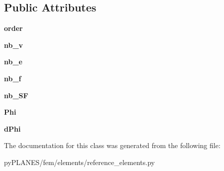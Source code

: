 \subsection*{Public Attributes}
\begin{DoxyCompactItemize}
\item 
\mbox{\label{classpy_p_l_a_n_e_s_1_1fem_1_1elements_1_1reference__elements_1_1_plot_kt_abc478f463a28762edb3e343e3fd0550d}} 
{\bfseries order}
\item 
\mbox{\label{classpy_p_l_a_n_e_s_1_1fem_1_1elements_1_1reference__elements_1_1_plot_kt_a360885cb9b9f72a6cd48cd97505694e8}} 
{\bfseries nb\+\_\+v}
\item 
\mbox{\label{classpy_p_l_a_n_e_s_1_1fem_1_1elements_1_1reference__elements_1_1_plot_kt_ad08640f7d41e5730576afde8b8f7cfdd}} 
{\bfseries nb\+\_\+e}
\item 
\mbox{\label{classpy_p_l_a_n_e_s_1_1fem_1_1elements_1_1reference__elements_1_1_plot_kt_a79eba5c966144c50e9e739f2ddfe7ce0}} 
{\bfseries nb\+\_\+f}
\item 
\mbox{\label{classpy_p_l_a_n_e_s_1_1fem_1_1elements_1_1reference__elements_1_1_plot_kt_a1e38168497fc584eeff61944603890f3}} 
{\bfseries nb\+\_\+\+SF}
\item 
\mbox{\label{classpy_p_l_a_n_e_s_1_1fem_1_1elements_1_1reference__elements_1_1_plot_kt_ae5cb1bfc26a4878bb8807f44fdb438f3}} 
{\bfseries Phi}
\item 
\mbox{\label{classpy_p_l_a_n_e_s_1_1fem_1_1elements_1_1reference__elements_1_1_plot_kt_a379e8b1f653c68fcc4ab9b41490954ab}} 
{\bfseries d\+Phi}
\end{DoxyCompactItemize}


The documentation for this class was generated from the following file\+:\begin{DoxyCompactItemize}
\item 
py\+P\+L\+A\+N\+E\+S/fem/elements/reference\+\_\+elements.\+py\end{DoxyCompactItemize}
